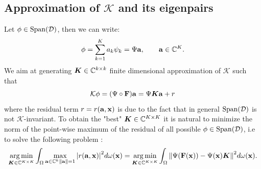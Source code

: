 \subsection{Approximation of $\mathcal{K}$ and its eigenpairs}
Let $\phi\in\mathrm{Span}(\mathcal{D})$, then we can write:
\begin{equation*}
    \phi = \sum_{k=1}^K a_k\psi_k = \Psi\vb{a}, \qquad \vb{a}\in\mathbb{C}^K.
\end{equation*}
We aim at generating $\vb*{K}\in\mathbb{C}^{k\times k}$ finite dimensional approximation of $\mathcal{K}$ such that
\begin{equation}
    \label{k_finite_dimensional}
    \mathcal{K}\vb{\phi} = (\Psi \circ \vb{F})\vb{a} = \Psi\vb*K\vb{a} + r
\end{equation}
where the residual term $r = r(\vb{a}, \vb{x})$ is due to the fact that in general $\mathrm{Span}(\mathcal{D})$ is not $\mathcal{K}$-invariant. To obtain the "best" $\vb*{K}\in\mathbb{C}^{K\times K}$ it is natural to minimize the norm of the point-wise maximum of the residual of all possible $\phi\in\mathrm{Span}(\mathcal{D})$, i.e to solve the following problem \cite{colbrook_rigorous_2021}:
\begin{equation}
    \label{edmd_integral_problem}
    \operatorname*{arg\,min}_{\vb*{K}\in\mathbb{C}^{K\times K}}\int_{\Omega} \max_{\vb{a}\in\mathbb{C}^k \\ \norm{\vb{a}} = 1}\abs{r(\vb{a}, \vb{x})}^2 d\omega(\vb{x}) = 
    \operatorname*{arg\,min}_{\vb*{K}\in\mathbb{C}^{K\times K}}\int_{\Omega} \norm{\Psi(\vb{F}(\vb{x})) - \Psi(\vb{x})\vb*{K}}^2 d\omega(\vb{x}).
\end{equation}

